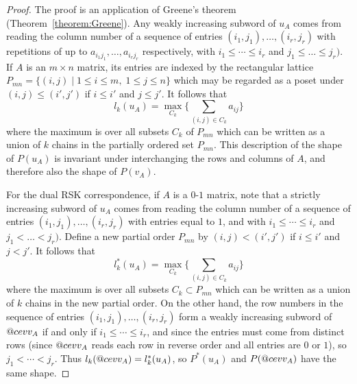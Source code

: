 \documentclass[11pt]{amsproc}
\makeatletter
\DeclareRobustCommand{\cev}[1]{%
  \mathpalette\do@cev{#1}%
}
\newcommand{\do@cev}[2]{%
  \fix@cev{#1}{+}%
  \reflectbox{$\m@th#1\vec{\reflectbox{$\fix@cev{#1}{-}\m@th#1#2\fix@cev{#1}{+}$}}$}%
  \fix@cev{#1}{-}%
}
\newcommand{\fix@cev}[2]{%
  \ifx#1\displaystyle
    \mkern#23mu
  \else
    \ifx#1\textstyle
      \mkern#23mu
    \else
      \ifx#1\scriptstyle
        \mkern#22mu
      \else
        \mkern#22mu
      \fi
    \fi
  \fi
}
\theoremstyle{definition}
\theoremstyle{example}
\makeatother
\begin{document}
\begin{proof}
  The proof is an application of Greene's theorem (Theorem~\ref{theorem:Greene}).
  Any weakly increasing subword of $u_A$ comes from reading the column number of a sequence of entries $(i_1,j_1),\dotsc,(i_r,j_r)$ with repetitions of up to $a_{i_1j_1},\dotsc, a_{i_rj_r}$ respectively, with $i_1\leq \dotsb \leq i_r$ and $j_1\leq \dotsc\leq j_r)$.
  If $A$ is an $m\times n$ matrix, its entries are indexed by the rectangular lattice $P_{mn} = \{(i,j)\mid 1\leq i\leq m,\;1\leq j\leq n\}$ which may be regarded as a poset under $(i,j)\leq (i',j')$ if $i\leq i'$ and $j\leq j'$.
  It follows that
  \begin{displaymath}
    l_k(u_A) = \max_{C_k} \Big\{\sum_{(i,j)\in C_k} a_{ij}\Big\}
  \end{displaymath}
  where the maximum is over all subsets $C_k$ of $P_{mn}$ which can be written as a union of $k$ chains in the partially ordered set $P_{mn}$.
  This description of the shape of $P(u_A)$ is invariant under interchanging the rows and columns of $A$, and therefore also the shape of $P(v_A)$.

  For the dual RSK correspondence, if $A$ is a $0$-$1$ matrix, note that a strictly increasing subword of $u_A$ comes from reading the column number of a sequence of entries $(i_1,j_1),\dotsc,(i_r,j_r)$ with entries equal to $1$, and with $i_1\leq \dotsb \leq i_r$ and $j_1<\dotsc<j_r)$.
  Define a new partial order $P_{mn}$ by $(i,j)<(i',j')$ if $i\leq i'$ and $j<j'$.
  It follows that
  \begin{displaymath}
    l_k^*(u_A) = \max_{C_k} \Big\{\sum_{(i,j)\in C_k} a_{ij}\Big\}
  \end{displaymath}
  where the maximum is over all subsets $C_k\subset P_{mn}$ which can be written as a union of $k$ chains in the new partial order.
  On the other hand, the row numbers in the sequence of entries $(i_1,j_1),\dotsc,(i_r,j_r)$ form a weakly increasing subword of $\cev v_A$ if and only if $i_1\leq \dotsb \leq i_r$, and since the entries must come from distinct rows (since $\cev v_A$ reads each row in reverse order and all entries are $0$ or $1$), so $j_1<\dotsb < j_r$.
  Thus $l_k(\cev v_A)=l_k^*(u_A)$, so $P^*(u_A)$ and $P(\cev v_A)$ have the same shape.
\end{proof}
\end{document}
